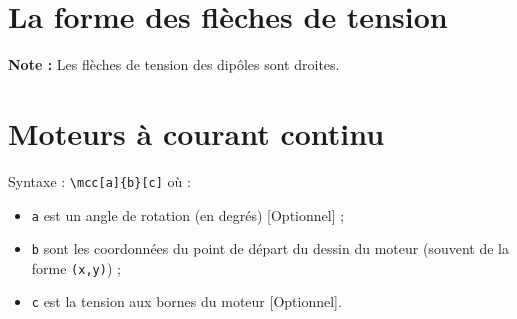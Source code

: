 \documentclass[a4paper,12pt]{article}
\begin{document}
		

	\section{La forme des flèches de tension}
		\textbf{Note : } Les flèches de tension des dipôles sont droites.
		
		
	\section{Moteurs à courant continu}
	
	Syntaxe : \verb!\mcc[a]{b}[c]! où :
	\begin{itemize}
		\item \verb!a! est un angle de rotation (en degrés) [Optionnel] ;
		\item \verb!b! sont les coordonnées du point de départ du dessin du moteur (souvent de la forme \verb!(x,y)!) ;
		\item \verb!c! est la tension aux bornes du moteur [Optionnel].
	\end{itemize}
	
\end{document}
